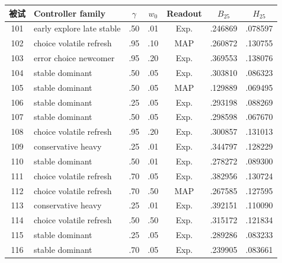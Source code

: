 \begin{center}
\scriptsize
\begin{tabular}{c|l|c|c|c|c|c}
被试 & Controller family & $\gamma$ & $w_0$ & Readout & $B_{25}$ & $H_{25}$\\
\hline
101 & early explore late stable & .50 & .01 & Exp. & .246869 & .078597\\
102 & choice volatile refresh & .95 & .10 & MAP & .260872 & .130755\\
103 & error choice newcomer & .95 & .20 & Exp. & .369553 & .138076\\
104 & stable dominant & .50 & .05 & Exp. & .303810 & .086323\\
105 & stable dominant & .50 & .05 & MAP & .129889 & .069495\\
106 & stable dominant & .25 & .05 & Exp. & .293198 & .088269\\
107 & stable dominant & .50 & .05 & Exp. & .298598 & .067670\\
108 & choice volatile refresh & .95 & .20 & Exp. & .300857 & .131013\\
109 & conservative heavy & .25 & .01 & Exp. & .344797 & .128229\\
110 & stable dominant & .50 & .01 & Exp. & .278272 & .089300\\
111 & choice volatile refresh & .70 & .05 & Exp. & .382956 & .130724\\
112 & choice volatile refresh & .70 & .50 & MAP & .267585 & .127595\\
113 & conservative heavy & .25 & .01 & Exp. & .392151 & .110090\\
114 & choice volatile refresh & .50 & .50 & Exp. & .315172 & .121834\\
115 & stable dominant & .25 & .05 & Exp. & .289286 & .083233\\
116 & stable dominant & .70 & .05 & Exp. & .239905 & .083661\\
\end{tabular}
\end{center}

